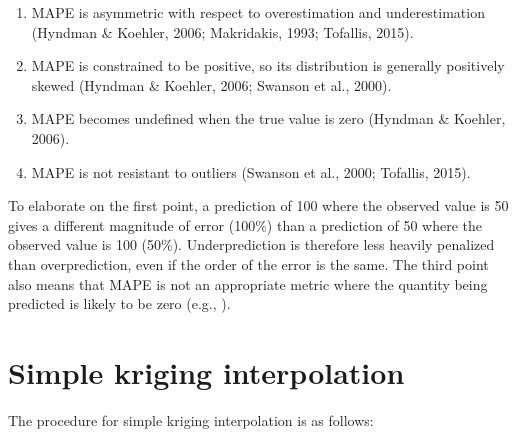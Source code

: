     \begin{enumerate}
    
        \item MAPE is asymmetric with respect to overestimation and underestimation (Hyndman \& Koehler, 2006; Makridakis, 1993; Tofallis, 2015).
        
        \item MAPE is constrained to be positive, so its distribution is generally positively skewed (Hyndman \& Koehler, 2006; Swanson et al., 2000).
        
        \item MAPE becomes undefined when the true value is zero (Hyndman \& Koehler, 2006). 
        
        \item MAPE is not resistant to outliers (Swanson et al., 2000; Tofallis, 2015).
        
    \end{enumerate}
    
    To elaborate on the first point, a prediction of 100 where the observed value is 50 gives a different magnitude of error (100\%) than a prediction of 50 where the observed value is 100 (50\%). Underprediction is therefore less heavily penalized than overprediction, even if the order of the error is the same. The third point also means that MAPE is not an appropriate metric where the quantity being predicted is likely to be zero (e.g., \cite{tofallis2015better}).%
    

\section{Simple kriging interpolation}\label{supp-c}

The procedure for simple kriging interpolation is as follows:

